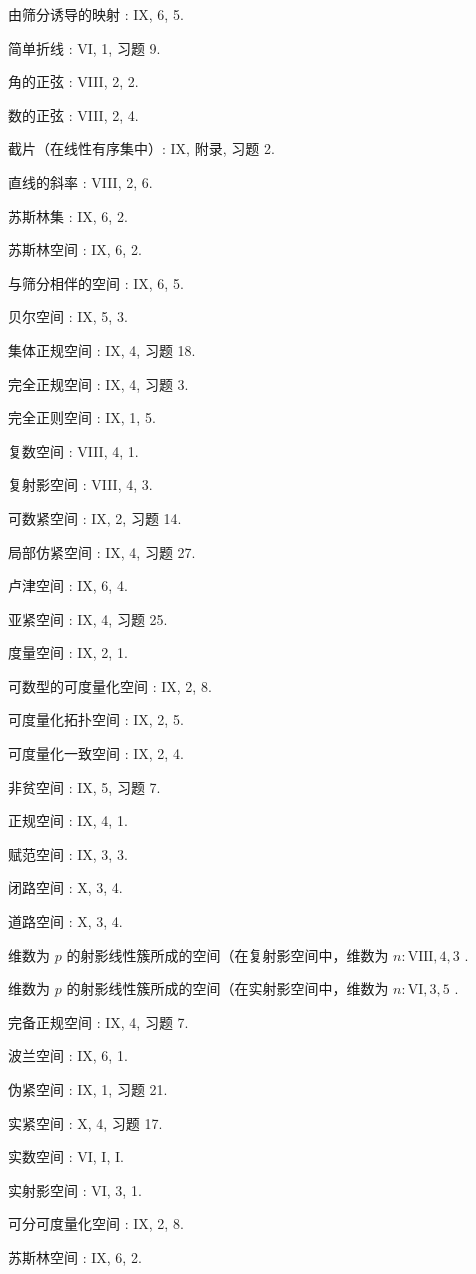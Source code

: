 由筛分诱导的映射 : IX, 6, 5.

简单折线 : VI, 1, 习题 9.

角的正弦 : VIII, 2, 2.

数的正弦 : VIII, 2, 4.

截片（在线性有序集中）: IX, 附录, 习题 2.

直线的斜率 : VIII, 2, 6.

苏斯林集 : IX, 6, 2.

苏斯林空间 : IX, 6, 2.

与筛分相伴的空间 : IX, 6, 5.

贝尔空间 : IX, 5, 3.

集体正规空间 : IX, 4, 习题 18.

完全正规空间 : IX, 4, 习题 3.

完全正则空间 : IX, 1, 5.

复数空间 : VIII, 4, 1.

复射影空间 : VIII, 4, 3.

可数紧空间 : IX, 2, 习题 14.

局部仿紧空间 : IX, 4, 习题 27.

卢津空间 : IX, 6, 4.

亚紧空间 : IX, 4, 习题 25.

度量空间 : IX, 2, 1.

可数型的可度量化空间 : IX, 2, 8.

可度量化拓扑空间 : IX, 2, 5.

可度量化一致空间 : IX, 2, 4.

非贫空间 : IX, 5, 习题 7.

正规空间 : IX, 4, 1.

赋范空间 : IX, 3, 3.

闭路空间 : X, 3, 4.

道路空间 : X, 3, 4.

维数为 \(p\) 的射影线性簇所成的空间（在复射影空间中，维数为 \(n: \text{VIII}, 4, 3\) .

维数为 \(p\) 的射影线性簇所成的空间（在实射影空间中，维数为 \(n: \mathrm{VI}, 3, 5\) .

完备正规空间 : IX, 4, 习题 7.

波兰空间 : IX, 6, 1.

伪紧空间 : IX, 1, 习题 21.

实紧空间 : X, 4, 习题 17.

实数空间 : VI, I, I.

实射影空间 : VI, 3, 1.

可分可度量化空间 : IX, 2, 8.

苏斯林空间 : IX, 6, 2.

